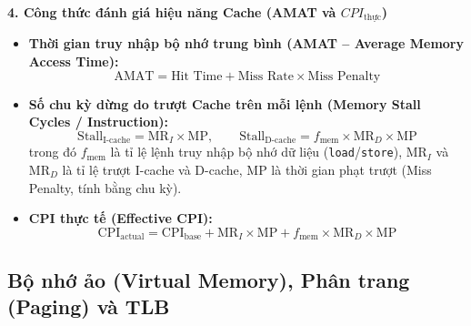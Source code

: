 \textbf{4. Công thức đánh giá hiệu năng Cache (AMAT và $CPI_{\text{thực}}$)}
\begin{tcolorbox}[bwbox, title={Công thức AMAT và CPI hiệu dụng khi xét Cache Miss}]
\begin{itemize}
    \item \textbf{Thời gian truy nhập bộ nhớ trung bình (AMAT -- Average Memory Access Time):}
    $$\text{AMAT} = \text{Hit Time} + \text{Miss Rate} \times \text{Miss Penalty}$$
    \item \textbf{Số chu kỳ dừng do trượt Cache trên mỗi lệnh (Memory Stall Cycles / Instruction):}
    $$\text{Stall}_{\text{I-cache}} = \text{MR}_I \times \text{MP}, \qquad \text{Stall}_{\text{D-cache}} = f_{\text{mem}} \times \text{MR}_D \times \text{MP}$$
    trong đó $f_{\text{mem}}$ là tỉ lệ lệnh truy nhập bộ nhớ dữ liệu (\texttt{load}/\texttt{store}), $\text{MR}_I$ và $\text{MR}_D$ là tỉ lệ trượt I-cache và D-cache, $\text{MP}$ là thời gian phạt trượt (Miss Penalty, tính bằng chu kỳ).
    \item \textbf{CPI thực tế (Effective CPI):}
    $$\text{CPI}_{\text{actual}} = \text{CPI}_{\text{base}} + \text{MR}_I \times \text{MP} + f_{\text{mem}} \times \text{MR}_D \times \text{MP}$$
\end{itemize}
\end{tcolorbox}

\subsection{Bộ nhớ ảo (Virtual Memory), Phân trang (Paging) và TLB}

